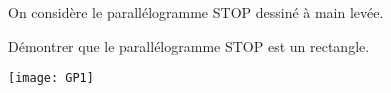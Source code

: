 

\begin{exercice}[]
On considère le  parallélogramme STOP dessiné à main levée.\\
\begin{minipage}{0.55\linewidth}


Démontrer que le parallélogramme STOP est un rectangle.

\end{minipage}
\hfill
\begin{minipage}{0.4\linewidth}
\begin{center}
\texttt{[image: GP1]}
\end{center}
\end{minipage}
\end{exercice}


